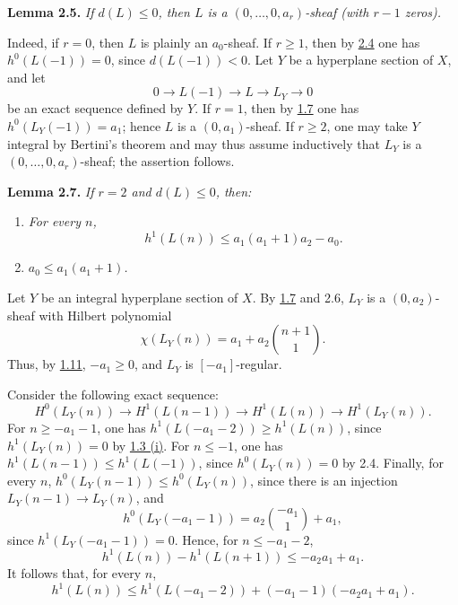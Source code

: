 \textbf{Lemma 2.5.} \emph{If \(d(L)\le0\), then \(L\) is a
\((0,\ldots,0,a_r)\)-sheaf (with \(r-1\) zeros).}

Indeed, if \(r=0\), then \(L\) is plainly an \(a_0\)-sheaf. If
\(r\ge1\), then by \hyperlink{sga6.e13.lem.2-4}{2.4} one has \(h^0(L(-1))=0\), since
\(d(L(-1))<0\). Let \(Y\) be a hyperplane section of \(X\), and let
\[
0\longrightarrow L(-1)\longrightarrow L\longrightarrow L_Y
\longrightarrow0
\]
be an exact sequence defined by \(Y\). If \(r=1\), then by \hyperlink{sga6.e13.lem.1-7}{1.7} one has
\(h^0(L_Y(-1))=a_1\); hence \(L\) is a \((0,a_1)\)-sheaf. If \(r\ge2\),
one may take \(Y\) integral by Bertini's theorem and may thus assume
inductively that \(L_Y\) is a \((0,\ldots,0,a_r)\)-sheaf; the assertion
follows.

\textbf{Lemma 2.7.} \emph{If \(r=2\) and \(d(L)\le0\), then:}
\begin{enumerate}[label=(\roman*)]
\item \emph{For every \(n\),
\[
h^1(L(n))\le a_1(a_1+1)a_2-a_0.
\]}
\item \emph{\(a_0\le a_1(a_1+1)\).}
\end{enumerate}

Let \(Y\) be an integral hyperplane section of \(X\). By \hyperlink{sga6.e13.lem.1-7}{1.7} and 2.6,
\(L_Y\) is a \((0,a_2)\)-sheaf with Hilbert polynomial
\[
\chi(L_Y(n))=a_1+a_2\binom{n+1}{1}.
\]
Thus, by \hyperlink{sga6.e13.thm.1-11}{1.11}, \(-a_1\ge0\), and \(L_Y\) is
\([-a_1]\)-regular.

Consider the following exact sequence:
\[
H^0(L_Y(n))\longrightarrow H^1(L(n-1))
\longrightarrow H^1(L(n))\longrightarrow H^1(L_Y(n)).
\]
For \(n\ge-a_1-1\), one has
\(h^1(L(-a_1-2))\ge h^1(L(n))\), since \(h^1(L_Y(n))=0\) by \hyperlink{sga6.e13.prop.1-3}{1.3 (i)}.
For \(n\le-1\), one has
\(h^1(L(n-1))\le h^1(L(-1))\), since \(h^0(L_Y(n))=0\) by 2.4.
Finally, for every \(n\),
\(h^0(L_Y(n-1))\le h^0(L_Y(n))\), since there is an injection
\(L_Y(n-1)\to L_Y(n)\), and
\[
h^0(L_Y(-a_1-1))=a_2\binom{-a_1}{1}+a_1,
\]
since \(h^1(L_Y(-a_1-1))=0\). Hence, for \(n\le-a_1-2\),
\[
h^1(L(n))-h^1(L(n+1))\le -a_2a_1+a_1.
\]
It follows that, for every \(n\),
\begin{equation}
h^1(L(n))\le
h^1(L(-a_1-2))+(-a_1-1)(-a_2a_1+a_1).
\tag{2.7.1}
\end{equation}

